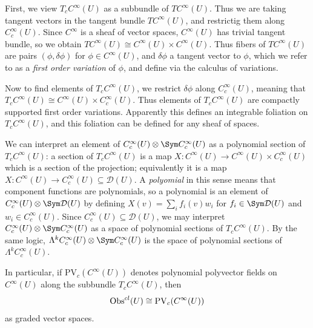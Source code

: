 First, we view $T_cC^\infty (U)$ as a subbundle of $TC^\infty (U)$. Thus we are taking tangent vectors in the tangent bundle $TC^\infty (U)$, and restrictig them along $C^\infty _c(U)$. Since $C^\infty $ is a sheaf of vector spaces, $C^\infty (U)$ has trivial tangent bundle, so we obtain $TC^\infty (U)\cong C^\infty (U)\times C^\infty (U)$. Thus fibers of $TC^\infty (U)$ are pairs $(\phi ,\delta \phi )$ for $\phi \in C^\infty (U)$, and $\delta \phi $ a tangent vector to $\phi $, which we refer to as a \emph{first order variation} of $\phi $, and define via the calculus of variations.

Now to find elements of $T_cC^\infty (U)$, we restrict $\delta \phi $ along $C_c^\infty (U)$, meaning that $T_cC^\infty (U) \cong C^\infty (U)\times C_c^\infty (U)$. Thus elements of $T_cC^\infty (U)$ are compactly supported first order variations. Apparently this defines an integrable foliation on $T_cC^\infty (U)$, and this foliation can be defined for any sheaf of spaces.

We can interpret an element of $C_c^\infty (U)\otimes \Sym C^\infty _c(U)$ as a polynomial section of $T_cC^\infty (U)$: a section of $T_cC^\infty (U)$ is a map $X : C^\infty (U) \to C^\infty (U)\times C^\infty _c(U)$ which is a section of the projection; equivalently it is a map $X: C^\infty (U) \to C_c^\infty (U)\subseteq \mathcal{D} (U)$. A \emph{polyomial} in this sense means that component functions are polynomials, so a polynomial is an element of $C_c^\infty (U) \otimes \Sym \mathcal{D} (U)$ by defining $X(v) = \sum_{i} f_i(v)w_i$ for $f_i \in \Sym \mathcal{D} (U)$ and $w_i\in C_c^\infty (U)$. Since $C_c^\infty (U)\subseteq \mathcal{D} (U)$, we may interpret $C_c^\infty (U)\otimes \Sym C^\infty _c(U)$ as a space of polynomial sections of $T_cC^\infty (U)$. By the same logic, $\Lambda^kC_c^\infty (U)\otimes \Sym C^\infty _c(U)$ is the space of polynomial sections of $\Lambda ^kC_c^\infty (U)$.

In particular, if $\mathrm{PV}_c(C^\infty (U))$ denotes polynomial polyvector fields on $C^\infty (U)$ along the subbundle $T_cC^\infty (U)$, then
\[
	\operatorname{Obs}^{cl} (U)\cong \mathrm{PV} _c(C^\infty (U))
\]
as graded vector spaces.



